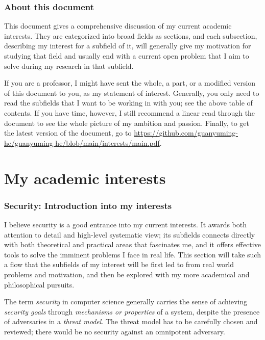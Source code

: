 \documentclass[10pt]{article}
\begin{document}
\tableofcontents

\section*{About this document}
This document gives a comprehensive discussion of my current academic
interests. They are categorized into broad fields as sections, and each
subsection, describing my interest for a subfield of it, will generally give my
motivation for studying that field and usually end with a current open problem
that I aim to solve during my research in that subfield.

If you are a professor, I might have sent the whole, a part, or a modified
version of this document to you, as my statement of interest. Generally, you
only need to read the subfields that I want to be working in with you; see the
above table of contents. If you have time, however, I still recommend a linear
read through the document to see the whole picture of my ambition and passion.
Finally, to get the latest version of the document, go to
\url{https://github.com/guanyuming-he/guanyuming-he/blob/main/interests/main.pdf}.

\part{My academic interests}

\section[Security]{Security: Introduction into my interests}
I believe security is a good entrance into my current interests. It awards both
attention to detail and high-level systematic view; its subfields connects
directly with both theoretical and practical areas that fascinates me, and it
offers effective tools to solve the imminent problems I face in real life. This
section will take such a flow that the subfields of my interest will be first
led to from real world problems and motivation, and then be explored with my
more academical and philosophical pursuits.

The term \emph{security} in computer science generally carries the sense of
achieving \emph{security goals} through \emph{mechanisms or properties} of a
system, despite the presence of adversaries in a \emph{threat model}. The
threat model has to be carefully chosen and reviewed; there would be no
security against an omnipotent adversary.
\end{document}
